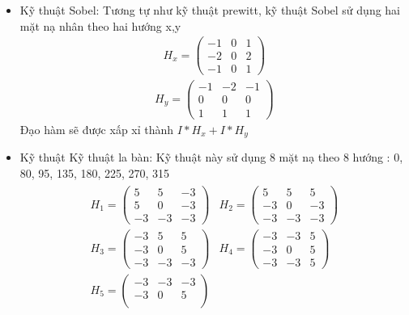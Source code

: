 \documentclass[12pt,oneside,a4]{report}
\begin{document}
\begin{itemize}
\item Kỹ thuật Sobel:
Tương tự như kỹ thuật prewitt, kỹ thuật Sobel sử dụng hai mặt nạ nhân theo hai hướng x,y
\begin{align*}
   H_x= \begin{pmatrix}
        -1 & 0 & 1 \\
        -2 & 0 & 2  \\
        -1 & 0 & 1
    \end{pmatrix}
\end{align*}
\begin{align*}
   H_y= \begin{pmatrix}
        -1 & -2 & -1 \\
        0 & 0 & 0  \\
        1 & 1 & 1
    \end{pmatrix}
\end{align*}
Đạo hàm sẽ được xấp xỉ thành $I\ast H_x+I\ast H_y$
\item Kỹ thuật Kỹ thuật la bàn: 
Kỹ thuật này sử dụng 8 mặt nạ theo 8 hướng : 0\degree, 80\degree, 95\degree, 135\degree, 180\degree, 225\degree, 270\degree, 315\degree
\begin{align*}
    \begin{matrix}
       H_1= \begin{pmatrix}
        5 & 5 & -3 \\
        5 & 0 & -3  \\
        -3 & -3 & -3
    \end{pmatrix} & H_2=\begin{pmatrix}
        5 & 5 & 5 \\
        -3 & 0 & -3  \\
        -3 & -3 & -3
    \end{pmatrix} \\
        H_3=\begin{pmatrix}
        -3 & 5 & 5 \\
        -3 & 0 & 5  \\
        -3 & -3 & -3
    \end{pmatrix} & H_4=\begin{pmatrix}
        -3 & -3 & 5 \\
        -3 & 0 & 5  \\
        -3 & -3 & 5
    \end{pmatrix}\\
       H_5= \begin{pmatrix}
        -3 & -3 & -3 \\
        -3 & 0 & 5  \\

\end{pmatrix}
\end{matrix}
\end{align*}
\end{itemize}
\end{document}
